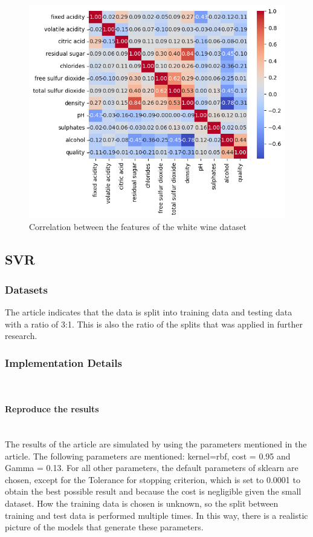 \documentclass{article}
\newcommand{\subsubsubsection}[1]{%
  \paragraph{#1}\mbox{}\\}
\begin{document}
\begin{figure}
	\centering
	\includegraphics[width=\linewidth]{figures/correlation_matrix.png}
	\caption{Correlation between the features of the white wine dataset}
	\label{fig:correlation-matrix}
\end{figure}

\subsection{SVR}

\subsubsection{Datasets}
The article indicates that the data is split into training data and testing data with a ratio of 3:1. This is also the ratio of the splits that was applied in further research.

\subsubsection{Implementation Details}

\subsubsubsection{Reproduce the results}
The results of the article are simulated by using the parameters mentioned in the article. The following parameters are mentioned: kernel=rbf, cost = 0.95 and Gamma = 0.13. For all other parameters, the default parameters of sklearn are chosen, except for the Tolerance for stopping criterion, which is set to 0.0001 to obtain the best possible result and because the cost is negligible given the small dataset.
How the training data is chosen is unknown, so the split between training and test data is performed multiple times. In this way, there is a realistic picture of the models that generate these parameters.
\end{document}
